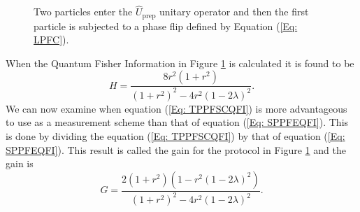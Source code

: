 \documentclass[twocolumn]{article}
\begin{document}
\begin{figure}[ht]
    \caption{\footnotesize{Two particles enter the $\hat{U}_{\text{prep}}$ unitary operator and then the first particle is subjected to a phase flip defined by Equation (\ref{Eq: LPFC}).}}
    \label{Fig: TPPFSCL} 
\end{figure}
\par \noindent
When the Quantum Fisher Information in Figure \ref{Fig: TPPFSCL} is calculated it is found to be
\begin{equation}\label{Eq: TPPFSCQFI}
H=\frac{8r^2(1+r^2)}{(1+r^2)^2-4r^2(1-2\lambda)^2}.
\end{equation}
We can now examine when equation (\ref{Eq: TPPFSCQFI}) is more advantageous to use as a measurement scheme than that of equation (\ref{Eq: SPPFEQFI}). This is done by dividing the equation (\ref{Eq: TPPFSCQFI}) by that of equation (\ref{Eq: SPPFEQFI}). This result is called the gain for the protocol in Figure \ref{Fig: TPPFSCL} and the gain is
\begin{equation}\label{Eq: TPPFSCG}
G=\frac{2(1+r^2)(1-r^2(1-2\lambda)^2)}{(1+r^2)^2-4r^2(1-2\lambda)^2}.
\end{equation}
\end{document}
